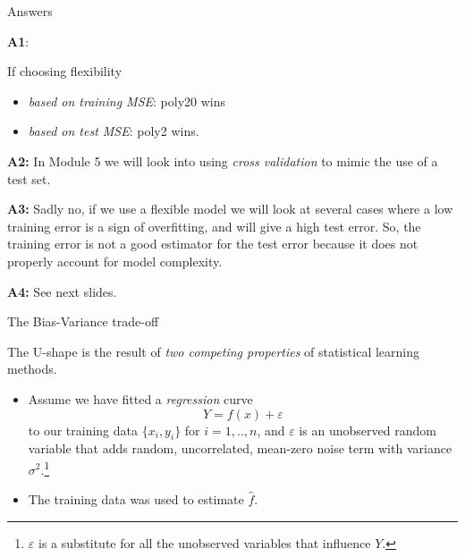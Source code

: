 \documentclass[ignorenonframetext,]{beamer}
\providecommand{\tightlist}{%
  \setlength{\itemsep}{0pt}\setlength{\parskip}{0pt}}
\begin{document}
\begin{frame}

Answers

\textbf{A1}:

If choosing flexibility

\begin{itemize}
\tightlist
\item
  \emph{based on training MSE}: poly20 wins
\item
  \emph{based on test MSE}: poly2 wins.
\end{itemize}

\textbf{A2:} In Module 5 we will look into using \emph{cross validation}
to mimic the use of a test set.

\textbf{A3:} Sadly no, if we use a flexible model we will look at
several cases where a low training error is a sign of overfitting, and
will give a high test error. So, the training error is not a good
estimator for the test error because it does not properly account for
model complexity.

\textbf{A4:} See next slides.

\end{frame}

\begin{frame}{The Bias-Variance trade-off}
\protect\hypertarget{the-bias-variance-trade-off}{}

\vspace{2mm}

The U-shape is the result of \emph{two competing properties} of
statistical learning methods.

\vspace{2mm}

\begin{itemize}
\tightlist
\item
  Assume we have fitted a \emph{regression} curve
  \[Y  = f(x) + \varepsilon\] to our training data \(\{x_i, y_i\}\) for
  \(i=1,..,n\), and \(\varepsilon\) is an unobserved random variable
  that adds random, uncorrelated, mean-zero noise term with variance
  \(\sigma^2\).\footnote{$\varepsilon$ is a substitute for all the unobserved variables that influence $Y$.}
\end{itemize}

\vspace{2mm}

\begin{itemize}
\tightlist
\item
  The training data was used to estimate \(\hat{f}\).
\end{itemize}

\end{frame}
\end{document}
